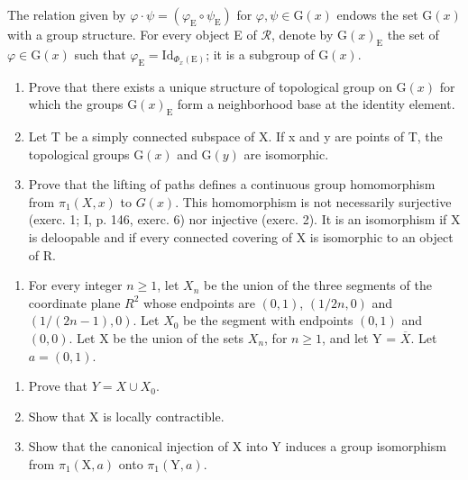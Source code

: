 The relation given by \(\varphi \cdot \psi = (\varphi_{\mathrm{E}} \circ \psi_{\mathrm{E}})\) for \(\varphi, \psi \in \mathrm{G}(x)\) endows the set \(\mathrm{G}(x)\) with a group structure. For every object E of \(\mathcal{R}\), denote by \(\mathrm{G}(x)_{\mathrm{E}}\) the set of \(\varphi \in \mathrm{G}(x)\) such that \(\varphi_{\mathrm{E}} = \mathrm{Id}_{\Phi_x(\mathrm{E})}\); it is a subgroup of \(\mathrm{G}(x)\).

\begin{enumerate}
\def\labelenumi{\alph{enumi})}
\setcounter{enumi}{2}
\item
  Prove that there exists a unique structure of topological group on \(\mathrm{G}(x)\) for which the groups \(\mathrm{G}(x)_{\mathrm{E}}\) form a neighborhood base at the identity element.
\item
  Let T be a simply connected subspace of X. If x and y are points of T, the topological groups \(\mathrm{G}(x)\) and \(\mathrm{G}(y)\) are isomorphic.
\item
  Prove that the lifting of paths defines a continuous group homomorphism from \(\pi_{1}(X,x)\) to \(G(x)\). This homomorphism is not necessarily surjective (exerc. 1; I, p. 146, exerc. 6) nor injective (exerc. 2). It is an isomorphism if X is deloopable and if every connected covering of X is isomorphic to an object of R.
\end{enumerate}

\begin{enumerate}
\def\labelenumi{\arabic{enumi})}
\setcounter{enumi}{3}
\tightlist
\item
  For every integer \(n \geqslant 1\), let \(X_{n}\) be the union of the three segments of the coordinate plane \(R^{2}\) whose endpoints are \((0,1)\), \((1/2n,0)\) and \((1/(2n-1),0)\). Let \(X_{0}\) be the segment with endpoints \((0,1)\) and \((0,0)\). Let X be the union of the sets \(X_{n}\), for \(n \geqslant 1\), and let Y = \(\overline{X}\). Let \(a = (0,1)\).
\end{enumerate}

\begin{enumerate}
\def\labelenumi{\alph{enumi})}
\item
  Prove that \(Y = X \cup X_{0}\).
\item
  Show that X is locally contractible.
\item
  Show that the canonical injection of X into Y induces a group isomorphism from \(\pi_1(\mathrm{X},a)\) onto \(\pi_1(\mathrm{Y},a)\).
\end{enumerate}

